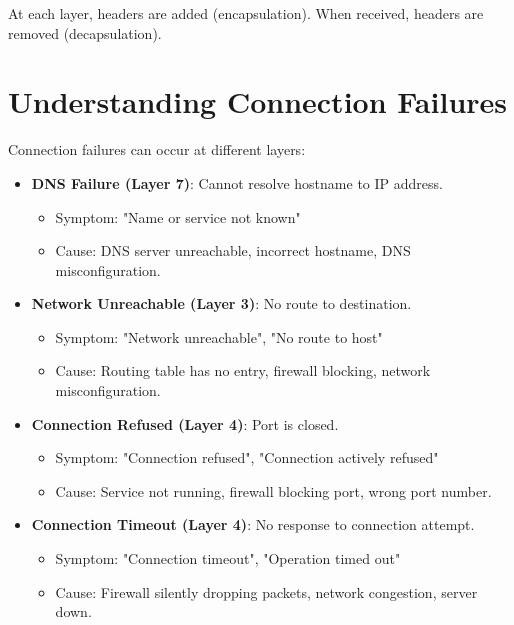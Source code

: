 At each layer, headers are added (encapsulation). When received, headers are removed (decapsulation).

\section{Understanding Connection Failures}

Connection failures can occur at different layers:

\begin{itemize}
    \item \textbf{DNS Failure (Layer 7)}: Cannot resolve hostname to IP address.
    \begin{itemize}
        \item Symptom: "Name or service not known"
        \item Cause: DNS server unreachable, incorrect hostname, DNS misconfiguration.
    \end{itemize}
    
    \item \textbf{Network Unreachable (Layer 3)}: No route to destination.
    \begin{itemize}
        \item Symptom: "Network unreachable", "No route to host"
        \item Cause: Routing table has no entry, firewall blocking, network misconfiguration.
    \end{itemize}
    
    \item \textbf{Connection Refused (Layer 4)}: Port is closed.
    \begin{itemize}
        \item Symptom: "Connection refused", "Connection actively refused"
        \item Cause: Service not running, firewall blocking port, wrong port number.
    \end{itemize}
    
    \item \textbf{Connection Timeout (Layer 4)}: No response to connection attempt.
    \begin{itemize}
        \item Symptom: "Connection timeout", "Operation timed out"
        \item Cause: Firewall silently dropping packets, network congestion, server down.
    \end{itemize}
\end{itemize}

